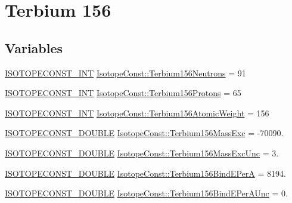 \hypertarget{group___isotope_const-_terbium-_tb156}{}\section{Terbium 156}
\label{group___isotope_const-_terbium-_tb156}
\subsection*{Variables}
\begin{DoxyCompactItemize}
\item 
\mbox{\hyperlink{group___isotope_const-_macros_ga5f18360b3e99483a35c32d789e62621c}{I\+S\+O\+T\+O\+P\+E\+C\+O\+N\+S\+T\+\_\+\+I\+NT}} \mbox{\hyperlink{group___isotope_const-_terbium-_tb156_ga9498d0738fd6ff096a8af3a5ac16e2da}{Isotope\+Const\+::\+Terbium156\+Neutrons}} = 91
\item 
\mbox{\hyperlink{group___isotope_const-_macros_ga5f18360b3e99483a35c32d789e62621c}{I\+S\+O\+T\+O\+P\+E\+C\+O\+N\+S\+T\+\_\+\+I\+NT}} \mbox{\hyperlink{group___isotope_const-_terbium-_tb156_ga0bf8760d28d5c3d754f772935f3480ee}{Isotope\+Const\+::\+Terbium156\+Protons}} = 65
\item 
\mbox{\hyperlink{group___isotope_const-_macros_ga5f18360b3e99483a35c32d789e62621c}{I\+S\+O\+T\+O\+P\+E\+C\+O\+N\+S\+T\+\_\+\+I\+NT}} \mbox{\hyperlink{group___isotope_const-_terbium-_tb156_ga6469ebef8ab052e2c792a7f9a0b26dae}{Isotope\+Const\+::\+Terbium156\+Atomic\+Weight}} = 156
\item 
\mbox{\hyperlink{group___isotope_const-_macros_ga8f45a7272ce02c0b4c65c44636ed719a}{I\+S\+O\+T\+O\+P\+E\+C\+O\+N\+S\+T\+\_\+\+D\+O\+U\+B\+LE}} \mbox{\hyperlink{group___isotope_const-_terbium-_tb156_ga7b8914aef652934bdd0a82c524a5570f}{Isotope\+Const\+::\+Terbium156\+Mass\+Exc}} = -\/70090.
\item 
\mbox{\hyperlink{group___isotope_const-_macros_ga8f45a7272ce02c0b4c65c44636ed719a}{I\+S\+O\+T\+O\+P\+E\+C\+O\+N\+S\+T\+\_\+\+D\+O\+U\+B\+LE}} \mbox{\hyperlink{group___isotope_const-_terbium-_tb156_gacf90dfbdc43be08cdb0203caa0669d82}{Isotope\+Const\+::\+Terbium156\+Mass\+Exc\+Unc}} = 3.
\item 
\mbox{\hyperlink{group___isotope_const-_macros_ga8f45a7272ce02c0b4c65c44636ed719a}{I\+S\+O\+T\+O\+P\+E\+C\+O\+N\+S\+T\+\_\+\+D\+O\+U\+B\+LE}} \mbox{\hyperlink{group___isotope_const-_terbium-_tb156_ga3df6abf736498b2cf5d17b30ed98e92f}{Isotope\+Const\+::\+Terbium156\+Bind\+E\+PerA}} = 8194.
\item 
\mbox{\hyperlink{group___isotope_const-_macros_ga8f45a7272ce02c0b4c65c44636ed719a}{I\+S\+O\+T\+O\+P\+E\+C\+O\+N\+S\+T\+\_\+\+D\+O\+U\+B\+LE}} \mbox{\hyperlink{group___isotope_const-_terbium-_tb156_ga38b7d665c34a7aa90481227f2898f082}{Isotope\+Const\+::\+Terbium156\+Bind\+E\+Per\+A\+Unc}} = 0.

\end{DoxyCompactItemize}
